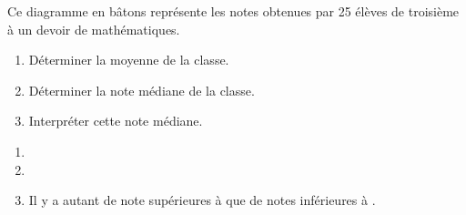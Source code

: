 \begin{exercice*}
    Ce diagramme en bâtons représente les notes obtenues par \num{25} élèves de troisième à un devoir de mathématiques.
    \par\smallskip
    \begin{enumerate}
        \item Déterminer la moyenne de la classe.
        \item Déterminer la note médiane de la classe.
        \item Interpréter cette note médiane.
    \end{enumerate}
\end{exercice*}
\begin{corrige}
    \begin{enumerate}
        \item {}
        \item {}
        \item Il y a autant de note supérieures à {\Mediane} que de notes inférieures à \Mediane.
    \end{enumerate}
\end{corrige}

